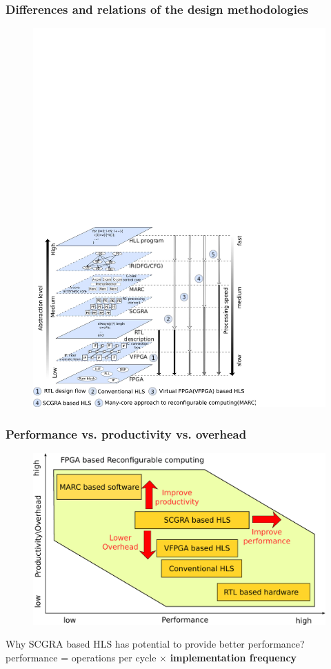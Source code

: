 \documentclass{beamer}
\begin{document}
\begin{frame}[t]
\frametitle{Differences and relations of the design methodologies}

\begin{figure}
\vspace{-1em}
\includegraphics[width=.9\linewidth]{virtual-overlay}
\end{figure}

\end{frame}

\begin{frame}[t]

\frametitle{Performance vs. productivity vs. overhead}
\begin{figure}
\vspace{-1em}
\includegraphics[width=0.7\linewidth]{performance-vs-productivity-vs-overhead}
\end{figure}

Why SCGRA based HLS has potential to provide better performance?\\
performance = operations per cycle $\times$ \textbf{implementation frequency}

\end{frame}
\end{document}
